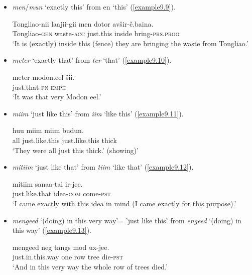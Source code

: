 \documentclass[output=paper,colorlinks,citecolor=brown]{langscibook}
\begin{document}
\begin{itemize}
\item \textit{men}/\textit{mun} ‘exactly this’ from en ‘this’ (\ref{example9.9}).

\ea
    \label{example9.9}
    \gll Tongliao-nii 	laajii-gii 	men 		dotor 	avšir-č.baina.\\
    Tongliao-\textsc{gen}	 waste-\textsc{acc}		just.this	inside	 bring-\textsc{prs.prog}\\
    \glt `It is (exactly) inside this (fence) they are bringing the waste from Tongliao.'\\
    \z

\item \textit{meter} ‘exactly that’ from \textit{ter} ‘that’ (\ref{example9.10}). 

\ea
    \label{example9.10}
    \gll meter 		modon.eel 	šii.\\
    just.that 	\textsc{pn} 		\textsc{emph}\\
    \glt `It was that very Modon eel.'\\
    \z

\item \textit{miim} ‘just like this’ from \textit{iim} ‘like this’ (\ref{example9.11}).

\ea
    \label{example9.11}
    \gll huu 	miim 		miim 		budun.\\
    all	just.like.this 	just.like.this 	thick\\
    \glt `They were all just this thick.’ (showing)'\\
    \z

\item \textit{mitiim} ‘just like that’ from \textit{tiim} ‘like that’ (\ref{example9.12}).

\ea
    \label{example9.12}
    \gll mitiim 		sanaa-tai 	ir-jee.\\
    just.like.that  	idea-\textsc{com} 	come-\textsc{pst}\\
    \glt `I came exactly with this idea in mind (I came exactly for this purpose).'\\
    \z

\item \textit{mengeed} ‘(doing) in this very way’= ’just like this’ from \textit{engeed} ‘(doing) in this way’ (\ref{example9.13}).

\ea
    \label{example9.13}
    \gll mengeed 		neg 	tangs 	mod 	ux-jee.\\
    just.in.this.way	one	row	tree	die-\textsc{pst}\\
    \glt `And in this very way the whole row of trees died.'\\
    \z


\end{itemize}
\end{document}
